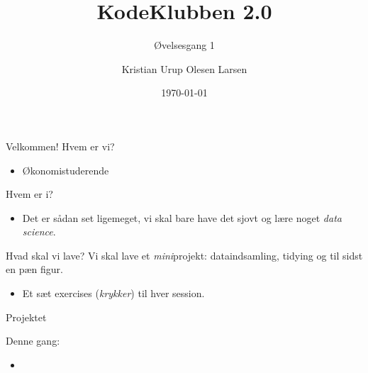 \documentclass[10pt]{beamer}
\title{KodeKlubben 2.0}
\subtitle{Øvelsesgang 1}
\date{\today}
\author{Kristian Urup Olesen Larsen}
\institute{Økonomisk Institut, KU}
\begin{document}
\maketitle

\begin{frame}[fragile]{Velkommen!}
Hvem er vi?
\begin{itemize}
  \item Økonomistuderende
\end{itemize}
Hvem er i?
\begin{itemize}
  \item Det er sådan set ligemeget, vi skal bare have det sjovt og lære noget \textit{data science}.
\end{itemize}
\end{frame}

\begin{frame}[fragile]{Hvad skal vi lave?}
Vi skal lave et \textit{mini}projekt: dataindsamling, tidying og til sidst en pæn figur.
\begin{itemize}
  \item Et sæt exercises (\textit{krykker}) til hver session.

\end{itemize}

\end{frame}

\begin{frame}[fragile]{Projektet}

Denne gang:
\begin{itemize}
  \item
\end{itemize}

\end{frame}
\end{document}
